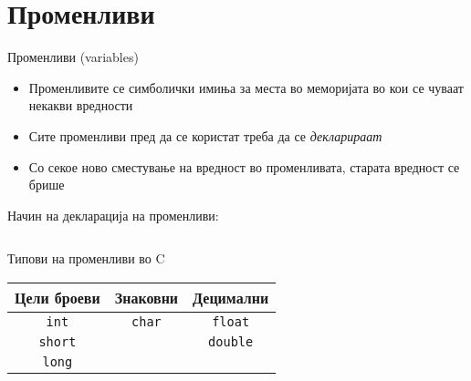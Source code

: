 \section{Променливи}

\begin{frame}{Променливи (variables)}
\begin{itemize}
\item Променливите се симболички имиња за места во меморијата во кои се чуваат некакви вредности
\item Сите променливи пред да се користат треба да се \emph{декларираат}
\item Со секое ново сместување на вредност во променливата, старата вредност се брише
\end{itemize}

Начин на декларација на променливи:
\linebreak
\begin{columns}
         
         
         \fbox{ = }
         
         \fbox{ ; }
\end{columns}   

\end{frame}

\begin{frame}{Типови на променливи во C}
\begin{center}
\begin{Large}
\begin{tabular}{c|c|c}
\textbf{Цели броеви} & \textbf{Знаковни} & \textbf{Децимални}\\
\hline
\texttt{int} & \texttt{char} & \texttt{float} \\
\hline
\texttt{short} & & \texttt{double} \\
\hline
\texttt{long} & &
\end{tabular}
\end{Large}
\end{center}
\end{frame}

